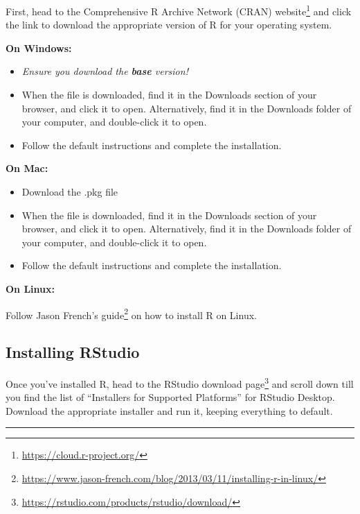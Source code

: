 \documentclass[]{tufte-handout}
\begin{document}
First, head to the Comprehensive R Archive Network (CRAN)
website\footnote{\url{https://cloud.r-project.org/}} and click the link
to download the appropriate version of R for your operating system.

\textbf{On Windows:}

\begin{itemize}
\item
  \emph{Ensure you download the \textbf{base} version!}
\item
  When the file is downloaded, find it in the Downloads section of your
  browser, and click it to open. Alternatively, find it in the Downloads
  folder of your computer, and double-click it to open.
\item
  Follow the default instructions and complete the installation.
\end{itemize}

\textbf{On Mac:}

\begin{itemize}
\item
  Download the .pkg file
\item
  When the file is downloaded, find it in the Downloads section of your
  browser, and click it to open. Alternatively, find it in the Downloads
  folder of your computer, and double-click it to open.
\item
  Follow the default instructions and complete the installation.
\end{itemize}

\textbf{On Linux:}

Follow Jason French's guide\footnote{\url{https://www.jason-french.com/blog/2013/03/11/installing-r-in-linux/}}
on how to install R on Linux.

\hypertarget{installing-rstudio}{%
\subsection{Installing RStudio}\label{installing-rstudio}}

Once you've installed R, head to the RStudio download page\footnote{\url{https://rstudio.com/products/rstudio/download/}}
and scroll down till you find the list of ``Installers for Supported
Platforms'' for RStudio Desktop. Download the appropriate installer and
run it, keeping everything to default.

\begin{center}\rule{0.5\linewidth}{\linethickness}\end{center}
\end{document}
